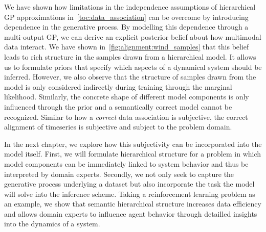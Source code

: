 We have shown how limitations in the independence assumptions of hierarchical GP approximations in~\cref{toc:data_association} can be overcome by introducing dependence in the generative proess.
By modelling this dependence through a multi-output GP, we can derive an explicit posterior belief about how multimodal data interact.
We have shown in~\cref{fig:alignment:wind_samples} that this belief leads to rich structure in the samples drawn from a hierarchical model.
It allows us to formulate priors that specify which aspects of a dynamical system should be inferred.
However, we also observe that the structure of samples drawn from the model is only considered indirectly during training through the marginal likelihood.
Similarly, the concrete shape of different model components is only influenced through the prior and a semantically correct model cannot be recognized.
Similar to how a \emph{correct} data association is subjective, the correct alignment of timeseries is subjective and subject to the problem domain.

In the next chapter, we explore how this subjectivity can be incorporated into the model itself.
First, we will formulate hierarchical structure for a problem in which model components can be immediately linked to system behavior and thus be interpreted by domain experts.
Secondly, we not only seek to capture the generative process underlying a dataset but also incorporate the task the model will solve into the inference scheme.
Taking a reinforcement learning problem as an example, we show that semantic hierarchical structure increases data efficiency and allows domain experts to influence agent behavior through detailled insights into the dynamics of a system.
